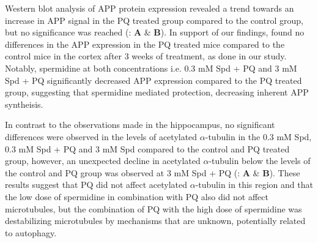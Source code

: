 Western blot analysis of APP protein expression revealed a trend towards an increase in APP signal in the PQ treated group compared to the control group, but no significance was reached  (: \textbf{A} \& \textbf{B}). In support of our findings, \citet{Chen2012} found no differences in the APP expression in the PQ treated mice compared to the control mice in the cortex after 3 weeks of treatment, as done in our study. Notably, spermidine at both concentrations i.e. 0.3 mM Spd + PQ and 3 mM Spd + PQ significantly decreased APP expression compared to the PQ treated group, suggesting that spermidine mediated protection, decreasing inherent APP syntheisis. 

In contrast to the observations made in the hippocampus, no significant differences were observed in the levels of acetylated $\alpha$-tubulin in the 0.3 mM Spd, 0.3 mM Spd + PQ and 3 mM Spd compared to the control and PQ treated group, however, an unexpected decline in acetylated $\alpha$-tubulin below the levels of the control and PQ group was observed at 3 mM Spd + PQ (: \textbf{A} \& \textbf{B}). These results suggest that PQ did not affect acetylated $\alpha$-tubulin in this region and that the low dose of spermidine in combination with PQ also did not affect microtubules, but the combination of PQ with the high dose of spermidine was destabilizing microtubules by mechanisms that are unknown, potentially related to autophagy. 

